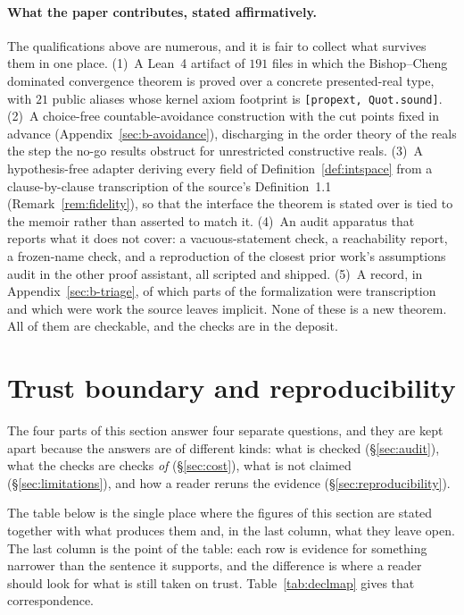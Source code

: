 \documentclass[11pt]{article}
\theoremstyle{definition}
\theoremstyle{remark}
\begin{document}
\paragraph{What the paper contributes, stated affirmatively.}
The qualifications above are numerous, and it is fair to collect what survives them
in one place.  (1)~A Lean~4 artifact of $191$ files in which the Bishop--Cheng
dominated convergence theorem is proved over a concrete presented-real type, with
$21$ public aliases whose kernel axiom footprint is \texttt{[propext, Quot.sound]}.
(2)~A choice-free countable-avoidance construction with the cut points fixed in
advance (Appendix~\ref{sec:b-avoidance}), discharging in the order theory of the
reals the step the no-go results obstruct for unrestricted constructive reals.
(3)~A hypothesis-free adapter deriving every field of Definition~\ref{def:intspace}
from a clause-by-clause transcription of the source's Definition~1.1
(Remark~\ref{rem:fidelity}), so that the interface the theorem is stated over is
tied to the memoir rather than asserted to match it.  (4)~An audit apparatus that
reports what it does not cover: a vacuous-statement check, a reachability report, a
frozen-name check, and a reproduction of the closest prior work's assumptions audit
in the other proof assistant, all scripted and shipped.  (5)~A record, in
Appendix~\ref{sec:b-triage}, of which parts of the formalization were
transcription and which were work the source leaves implicit.  None of these is a
new theorem.  All of them are checkable, and the checks are in the deposit.

\section{Trust boundary and reproducibility}
\label{sec:trust}

The four parts of this section answer four separate questions, and they are kept
apart because the answers are of different kinds: what is checked
(\S\ref{sec:audit}), what the checks are checks \emph{of}
(\S\ref{sec:cost}), what is not claimed (\S\ref{sec:limitations}), and how a
reader reruns the evidence (\S\ref{sec:reproducibility}).

The table below is the single place where the figures of this section are stated
together with what produces them and, in the last column, what they leave open.  The
last column is the point of the table: each row is evidence for something narrower
than the sentence it supports, and the difference is where a reader should look for
what is still taken on trust.  Table~\ref{tab:declmap} gives that correspondence.
\end{document}
